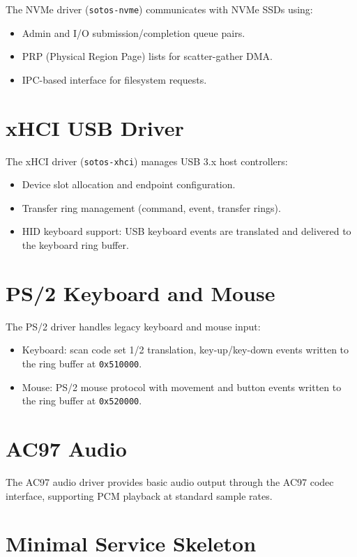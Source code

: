 \documentclass[11pt,a4paper,twoside]{report}
\theoremstyle{definition}
\newcommand{\hex}[1]{\texttt{0x#1}}
\begin{document}
The NVMe driver (\texttt{sotos-nvme}) communicates with NVMe SSDs using:
\begin{itemize}[leftmargin=1.4em]
  \item Admin and I/O submission/completion queue pairs.
  \item PRP (Physical Region Page) lists for scatter-gather DMA.
  \item IPC-based interface for filesystem requests.
\end{itemize}

\section{xHCI USB Driver}

The xHCI driver (\texttt{sotos-xhci}) manages USB 3.x host controllers:
\begin{itemize}[leftmargin=1.4em]
  \item Device slot allocation and endpoint configuration.
  \item Transfer ring management (command, event, transfer rings).
  \item HID keyboard support: USB keyboard events are translated and
    delivered to the keyboard ring buffer.
\end{itemize}

\section{PS/2 Keyboard and Mouse}

The PS/2 driver handles legacy keyboard and mouse input:
\begin{itemize}[leftmargin=1.4em]
  \item Keyboard: scan code set 1/2 translation, key-up/key-down events
    written to the ring buffer at \hex{510000}.
  \item Mouse: PS/2 mouse protocol with movement and button events
    written to the ring buffer at \hex{520000}.
\end{itemize}

\section{AC97 Audio}

The AC97 audio driver provides basic audio output through the AC97 codec
interface, supporting PCM playback at standard sample rates.

\section{Minimal Service Skeleton}
\end{document}
